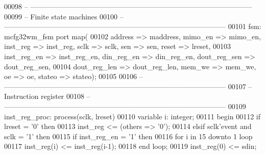 \begin{DoxyCode}
00098 \textcolor{keyword}{    -- ---------------------------------------------------------------------------------------------}
00099 \textcolor{keyword}{    -- Finite state machines}
00100 \textcolor{keyword}{    -- ---------------------------------------------------------------------------------------------}
00101     fsm: mcfg32wm_fsm \textcolor{keywordflow}{port} \textcolor{keywordflow}{map}( 
00102         address => maddress, mimo_en => mimo_en, inst_reg => inst_reg, sclk => 
      sclk, sen => sen, reset => lreset,
00103         inst_reg_en => inst_reg_en, din_reg_en => din_reg_en, dout_reg_sen => 
      dout_reg_sen,
00104         dout_reg_len => dout_reg_len, mem_we => mem_we, oe => oe, stateo => 
      stateo\textcolor{vhdlchar}{)};
00105         
00106 \textcolor{keyword}{    -- ---------------------------------------------------------------------------------------------}
00107 \textcolor{keyword}{    -- Instruction register}
00108 \textcolor{keyword}{    -- ---------------------------------------------------------------------------------------------}
00109     inst\_reg\_proc: \textcolor{keywordflow}{process}(sclk, lreset)
00110         \textcolor{keywordflow}{variable} \textcolor{vhdlchar}{i}\textcolor{vhdlchar}{:} \textcolor{comment}{integer};
00111 \textcolor{vhdlkeyword}{    begin}
00112         \textcolor{keywordflow}{if} \textcolor{vhdlchar}{lreset} \textcolor{vhdlchar}{=} \textcolor{vhdlchar}{'}\textcolor{vhdllogic}{}\textcolor{vhdllogic}{0}\textcolor{vhdlchar}{'} \textcolor{keywordflow}{then}
00113             inst\_reg <= (\textcolor{keywordflow}{others} => '0');
00114         \textcolor{keywordflow}{elsif} \textcolor{vhdlchar}{sclk}\textcolor{vhdlchar}{'}\textcolor{vhdlkeyword}{event} \textcolor{keywordflow}{and} \textcolor{vhdlchar}{sclk} \textcolor{vhdlchar}{=} \textcolor{vhdlchar}{'}\textcolor{vhdllogic}{}\textcolor{vhdllogic}{1}\textcolor{vhdlchar}{'} \textcolor{keywordflow}{then}
00115             \textcolor{keywordflow}{if} \textcolor{vhdlchar}{inst_reg_en} \textcolor{vhdlchar}{=} \textcolor{vhdlchar}{'}\textcolor{vhdllogic}{}\textcolor{vhdllogic}{1}\textcolor{vhdlchar}{'} \textcolor{keywordflow}{then}
00116                 \textcolor{keywordflow}{for} \textcolor{vhdlchar}{i} \textcolor{keywordflow}{in} \textcolor{vhdllogic}{}\textcolor{vhdllogic}{15} \textcolor{keywordflow}{downto} \textcolor{vhdllogic}{}\textcolor{vhdllogic}{1} \textcolor{keywordflow}{loop}
00117                     inst\_reg(i) <= inst\_reg(i-1);
00118                 \textcolor{keywordflow}{end} \textcolor{keywordflow}{loop};
00119                 inst\_reg(\textcolor{vhdllogic}{0}) <= sdin;

\end{DoxyCode}
